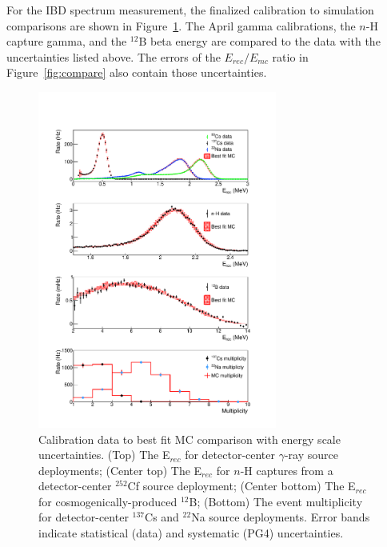For the IBD spectrum measurement, the finalized calibration to simulation comparisons are shown in Figure~\ref{fig:calibfinal}.
The April gamma calibrations, the $n$-H capture gamma, and the $^{12}$B beta energy are compared to the data with the uncertainties listed above.
The errors of the $E_{rec}/E_{mc}$ ratio in Figure~\ref{fig:compare} also contain those uncertainties.
\begin{figure}[h!]
\centering
\includegraphics[width=0.7\textwidth]{Figures/CalibPaperPlotV2.pdf}
\caption[Calibration data to best fit MC comparison with energy scale uncertainties.]{Calibration data to best fit MC comparison with energy scale uncertainties. 
(Top) The E$_{rec}$ for detector-center $\gamma$-ray source deployments; (Center top) The E$_{rec}$ for $n$-H captures from a detector-center $^{252}$Cf source deployment; (Center bottom) The E$_{rec}$ for cosmogenically-produced $^{12}$B; (Bottom) The event multiplicity for detector-center $^{137}$Cs and $^{22}$Na source deployments.  
Error bands indicate statistical (data) and systematic (PG4) uncertainties.}
\label{fig:calibfinal}
\end{figure}

